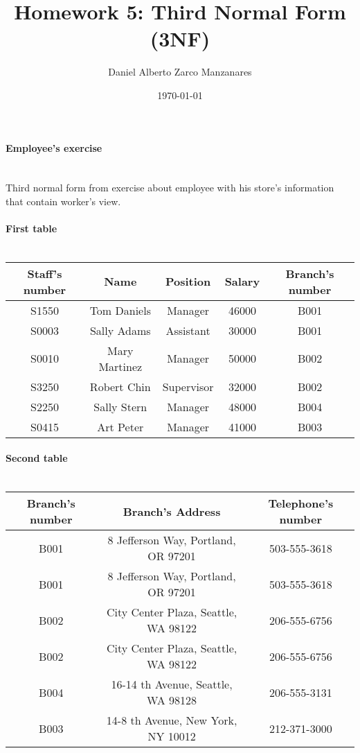 \documentclass{article}
\begin{document}
\title{Homework 5: Third Normal Form (3NF)}
\author{Daniel Alberto Zarco Manzanares}
\date{\today}
\maketitle
\paragraph{Employee's exercise\\\\}
Third normal form from exercise about employee with his store's information that contain worker's view.
\paragraph{First table\\\\}
\begin{tabular}{|c|c|c|c|c|}
Staff's number & Name & Position & Salary & Branch's number\\
\hline
S1550 & Tom Daniels & Manager & 46000 & B001\\
S0003 & Sally Adams & Assistant & 30000 & B001\\
S0010 & Mary Martinez & Manager & 50000 & B002\\
S3250 & Robert Chin & Supervisor & 32000 & B002\\
S2250 & Sally Stern & Manager & 48000 & B004\\
S0415 & Art Peter & Manager & 41000 & B003 \\
\end{tabular}
\paragraph{Second table\\\\}
\begin{tabular}{|c|c|c|}
Branch's number & Branch's Address & Telephone's number\\
\hline
B001 & 8 Jefferson Way, Portland, OR 97201 & 503-555-3618\\
B001 & 8 Jefferson Way, Portland, OR 97201 & 503-555-3618\\
B002 & City Center Plaza, Seattle, WA 98122 & 206-555-6756\\
B002 & City Center Plaza, Seattle, WA 98122 & 206-555-6756\\
B004 & 16-14 th Avenue, Seattle, WA 98128 & 206-555-3131\\
B003 & 14-8 th Avenue, New York, NY 10012 & 212-371-3000\\
\end{tabular}
\end{document}

